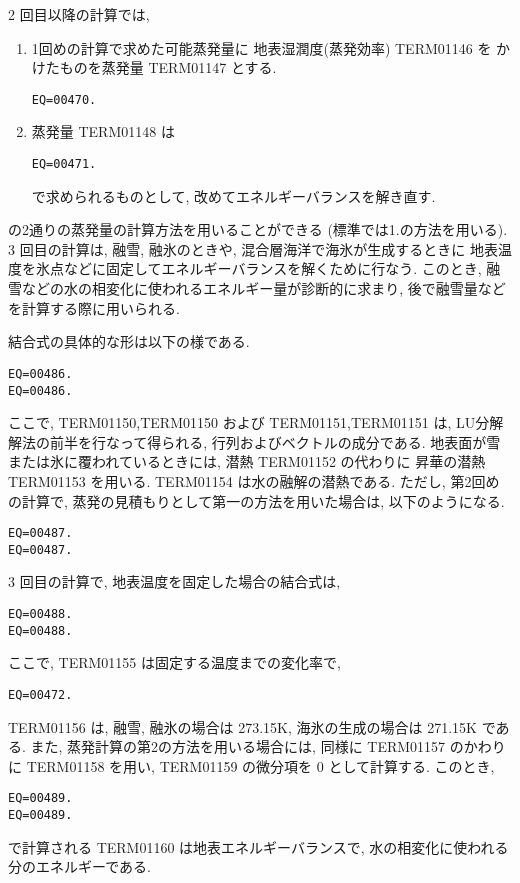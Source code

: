 2 回目以降の計算では, 
\begin{enumerate}
\item 1回めの計算で求めた可能蒸発量に
      地表湿潤度(蒸発効率) TERM01146 を
      かけたものを蒸発量 TERM01147 とする.
      \begin{verbatim}
EQ=00470.
\end{verbatim}

\item 蒸発量 TERM01148 は
      \begin{verbatim}
EQ=00471.
\end{verbatim}
      で求められるものとして, 
      改めてエネルギーバランスを解き直す.
\end{enumerate}
の2通りの蒸発量の計算方法を用いることができる
(標準では1.の方法を用いる).
3 回目の計算は, 融雪, 融氷のときや, 混合層海洋で海氷が生成するときに
地表温度を氷点などに固定してエネルギーバランスを解くために行なう. 
このとき, 融雪などの水の相変化に使われるエネルギー量が診断的に求まり, 
後で融雪量などを計算する際に用いられる. 

結合式の具体的な形は以下の様である. 
%
\begin{verbatim}
EQ=00486.
EQ=00486.
\end{verbatim}
%
ここで, TERM01150,TERM01150 および TERM01151,TERM01151 は, 
LU分解解法の前半を行なって得られる, 行列およびベクトルの成分である. 
地表面が雪または氷に覆われているときには, 潜熱 TERM01152 の代わりに
昇華の潜熱 TERM01153 を用いる. TERM01154 は水の融解の潜熱である. 
%
ただし, 第2回めの計算で, 
蒸発の見積もりとして第一の方法を用いた場合は, 以下のようになる.
\begin{verbatim}
EQ=00487.
EQ=00487.
\end{verbatim}

3 回目の計算で, 地表温度を固定した場合の結合式は, 
\begin{verbatim}
EQ=00488.
EQ=00488.
\end{verbatim}
ここで, TERM01155 は固定する温度までの変化率で, 
\begin{verbatim}
EQ=00472.
\end{verbatim}
TERM01156 は, 融雪, 融氷の場合は 273.15K, 
海氷の生成の場合は 271.15K である. 
また, 蒸発計算の第2の方法を用いる場合には,
同様に TERM01157 のかわりに TERM01158 を用い,
TERM01159 の微分項を 0 として計算する.
このとき, 
\begin{verbatim}
EQ=00489.
EQ=00489.
\end{verbatim}
で計算される TERM01160 は地表エネルギーバランスで, 
水の相変化に使われる分のエネルギーである. 

